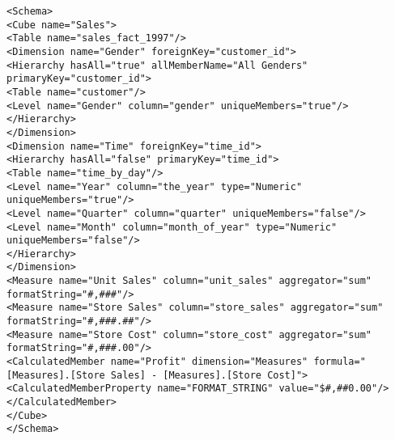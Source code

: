 \begin{verbatim}
<Schema>
<Cube name="Sales">
<Table name="sales_fact_1997"/>
<Dimension name="Gender" foreignKey="customer_id">
<Hierarchy hasAll="true" allMemberName="All Genders" primaryKey="customer_id">
<Table name="customer"/>
<Level name="Gender" column="gender" uniqueMembers="true"/>
</Hierarchy>
</Dimension>
<Dimension name="Time" foreignKey="time_id">
<Hierarchy hasAll="false" primaryKey="time_id">
<Table name="time_by_day"/>
<Level name="Year" column="the_year" type="Numeric" uniqueMembers="true"/>
<Level name="Quarter" column="quarter" uniqueMembers="false"/>
<Level name="Month" column="month_of_year" type="Numeric" uniqueMembers="false"/>
</Hierarchy>
</Dimension>
<Measure name="Unit Sales" column="unit_sales" aggregator="sum" formatString="#,###"/>
<Measure name="Store Sales" column="store_sales" aggregator="sum" formatString="#,###.##"/>
<Measure name="Store Cost" column="store_cost" aggregator="sum" formatString="#,###.00"/>
<CalculatedMember name="Profit" dimension="Measures" formula="[Measures].[Store Sales] - [Measures].[Store Cost]">
<CalculatedMemberProperty name="FORMAT_STRING" value="$#,##0.00"/>
</CalculatedMember>
</Cube>
</Schema>
\end{verbatim}
